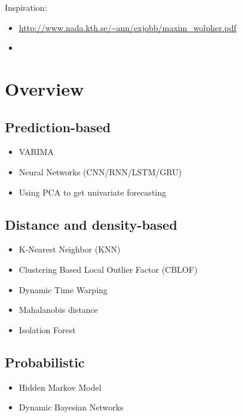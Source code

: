 Inspiration:
\begin{itemize}
    \item \url{http://www.nada.kth.se/~ann/exjobb/maxim_wolpher.pdf}
    \item \cite{Aggarwal2013a}
\end{itemize}

\section*{Overview}

\subsection{Prediction-based}

\begin{itemize}
    \item VARIMA \cite{Aggarwal2013a}
    \item Neural Networks (CNN/RNN/LSTM/GRU)
    \item Using PCA to get univariate forecasting \cite{Aggarwal2013a}

\end{itemize}

\subsection{Distance and density-based}

\begin{itemize}
    \item K-Nearest Neighbor (KNN) \cite{Li2019a}
    \item Clustering Based Local Outlier Factor (CBLOF) \cite{Li2019a}
    \item Dynamic Time Warping \cite{Aggarwal2013a}
    \item Mahalanobis distance \cite{Aggarwal2013a}
    \item Isolation Forest 
\end{itemize}

\subsection{Probabilistic}

\begin{itemize}
    \item Hidden Markov Model \cite{Aggarwal2013a}
    \item Dynamic Bayesian Networks
\end{itemize}


